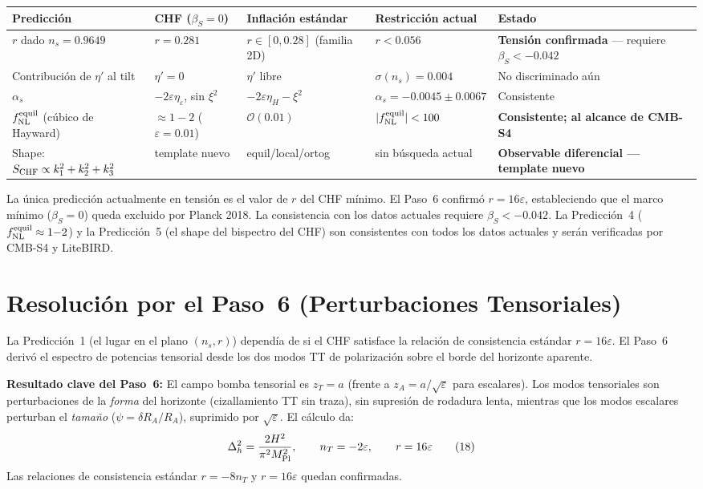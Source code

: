 \documentclass[12pt,a4paper]{article}
\begin{document}
\begin{table}[h]
\centering
\small
\begin{tabular}{@{}lp{2.5cm}p{2.4cm}p{2.4cm}p{3cm}@{}}
\toprule
Predicción & CHF ($\beta_S=0$) & Inflación estándar & Restricción actual & Estado \\
\midrule
$r$ dado $n_s = 0.9649$ & $r = 0.281$ & $r \in [0, 0.28]$ (familia 2D) & $r < 0.056$ & \textbf{Tensión confirmada} --- requiere $\beta_S < -0.042$ \\[4pt]
Contribución de $\eta'$ al tilt & $\eta' = 0$ & $\eta'$ libre & $\sigma(n_s) = 0.004$ & No discriminado aún \\[4pt]
$\alpha_s$ & $-2\varepsilon\eta_\varepsilon$, sin $\xi^2$ & $-2\varepsilon\eta_H - \xi^2$ & $\alpha_s = -0.0045 \pm 0.0067$ & Consistente \\[4pt]
$f_{\rm NL}^{\rm equil}$ (cúbico de Hayward) & $\approx 1{-}2$ ($\varepsilon=0.01$) & $\mathcal{O}(0.01)$ & $|f_{\rm NL}^{\rm equil}| < 100$ & \textbf{Consistente; al alcance de CMB-S4} \\[4pt]
Shape: $S_{\rm CHF}\propto k_1^2+k_2^2+k_3^2$ & template nuevo & equil/local/ortog & sin búsqueda actual & \textbf{Observable diferencial --- template nuevo} \\
\bottomrule
\end{tabular}
\end{table}

La única predicción actualmente en tensión es el valor de $r$ del CHF mínimo. El Paso~6 confirmó $r = 16\varepsilon$, estableciendo que el marco mínimo ($\beta_S = 0$) queda excluido por Planck 2018. La consistencia con los datos actuales requiere $\beta_S < -0.042$. La Predicción~4 ($f_{\rm NL}^{\rm equil}\approx 1{-}2$) y la Predicción~5 (el shape del bispectro del CHF) son consistentes con todos los datos actuales y serán verificadas por CMB-S4 y LiteBIRD.

\section{Resolución por el Paso~6 (Perturbaciones Tensoriales)}

La Predicción~1 (el lugar en el plano $(n_s, r)$) dependía de si el CHF satisface la relación de consistencia estándar $r = 16\varepsilon$. El Paso~6 derivó el espectro de potencias tensorial desde los dos modos TT de polarización sobre el borde del horizonte aparente.

\textbf{Resultado clave del Paso~6:} El campo bomba tensorial es $z_T = a$ (frente a $z_A = a/\sqrt{\varepsilon}$ para escalares). Los modos tensoriales son perturbaciones de la \textit{forma} del horizonte (cizallamiento TT sin traza), sin supresión de rodadura lenta, mientras que los modos escalares perturban el \textit{tamaño} ($\psi = \delta R_A/R_A$), suprimido por $\sqrt\varepsilon$. El cálculo da:
\begin{equation}
\Delta_h^2 = \frac{2H^2}{\pi^2 M_{\rm Pl}^2}, \qquad n_T = -2\varepsilon, \qquad r = 16\varepsilon \tag{18}
\end{equation}
Las relaciones de consistencia estándar $r = -8n_T$ y $r = 16\varepsilon$ quedan confirmadas.
\end{document}
